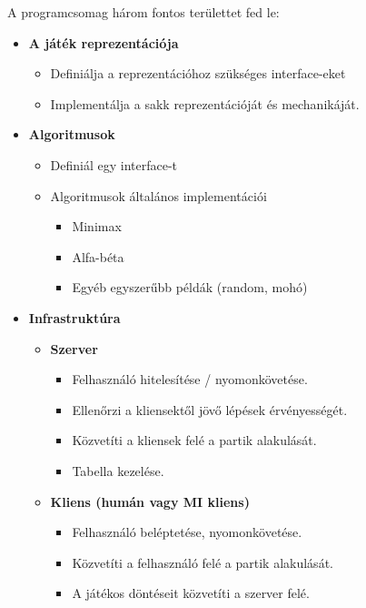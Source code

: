 \documentclass[twoside, a4paper, 12pt]{article}
\begin{document}
A programcsomag három fontos területtet fed le:
\begin{itemize}
	
	\item \textbf{A játék reprezentációja}
	\begin{itemize}
		\item Definiálja a reprezentációhoz szükséges interface-eket
		\item Implementálja a sakk reprezentációját és mechanikáját.
	\end{itemize}

	\item \textbf{Algoritmusok}
	\begin{itemize}
		\item Definiál egy interface-t
		\item Algoritmusok általános implementációi
		\begin{itemize}
			\item Minimax
			\item Alfa-béta
			\item Egyéb egyszerűbb példák (random, mohó)
		\end{itemize}
	\end{itemize}

	\item \textbf{Infrastruktúra}
	\begin{itemize}
		
		\item \textbf{Szerver}
		\begin{itemize}
			\item Felhasználó hitelesítése / nyomonkövetése.
			\item Ellenőrzi a kliensektől jövő lépések érvényességét.
			\item Közvetíti a kliensek felé a partik alakulását.
			\item Tabella kezelése.
		\end{itemize}
	
		\item \textbf{Kliens (humán vagy MI kliens)}
		\begin{itemize}
			\item Felhasználó beléptetése, nyomonkövetése.
			\item Közvetíti a felhasználó felé a partik alakulását.
			\item A játékos döntéseit közvetíti a szerver felé.
		\end{itemize}
	\end{itemize}
\end{itemize}
\end{document}
